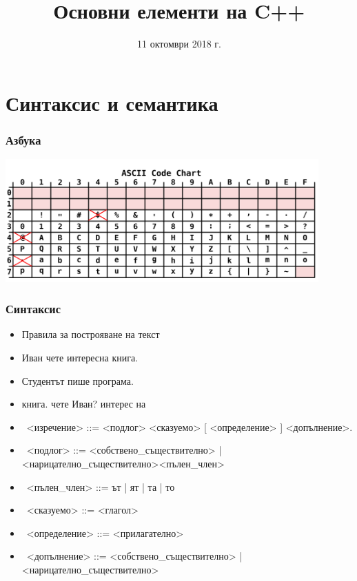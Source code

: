 \documentclass{beamer}
\title{Основни елементи на C++}
\date{11 октомври 2018 г.}
\begin{document}
\begin{frame}
  \titlepage
\end{frame}

\section{Синтаксис и семантика}

\begin{frame}
  \frametitle{Азбука}
  \begin{center}
    \includegraphics[width=0.9\textwidth]{images/ascii.pdf}\\[2em]
  \end{center}
  \wiki
\end{frame}

\begin{frame}
  \frametitle{Синтаксис}
  \begin{itemize}[<+->]
  \item Правила за построяване на текст
  \item \alert{Иван чете интересна книга.}
  \item \alert{Студентът пише програма.}
  \item \alert{книга. чете Иван? интерес на}
  \item\ <изречение> ::= <подлог> <сказуемо> [ <определение> ] <допълнение>\alert.
  \item\ <подлог> ::= <собствено\_съществително> | <нарицателно\_съществително><пълен\_член>
  \item\ <пълен\_член> ::= \alert{ът} | \alert{ят} | \alert{та} | \alert{то}
  \item\ <сказуемо> ::= <глагол>
  \item\ <определение> ::= <прилагателно>
  \item\ <допълнение> ::= <собствено\_съществително> | <нарицателно\_съществително>
  \end{itemize}
\end{frame}
\end{document}
